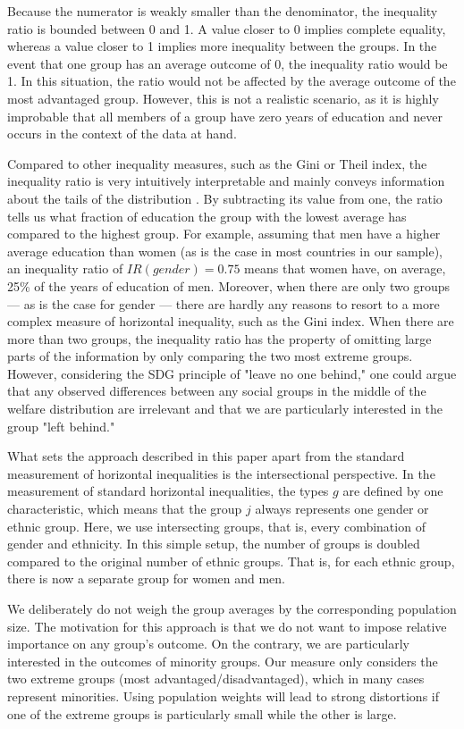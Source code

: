Because the numerator is weakly smaller than the denominator, the inequality ratio is bounded between 0 and 1. A value closer to 0 implies complete equality, whereas a value closer to 1 implies more inequality between the groups. In the event that one group has an average outcome of 0, the inequality ratio would be 1. In this situation, the ratio would not be affected by the average outcome of the most advantaged group. However, this is not a realistic scenario, as it is highly improbable that all members of a group have zero years of education and never occurs in the context of the data at hand.

Compared to other inequality measures, such as the Gini or Theil index, the inequality ratio is very intuitively interpretable and mainly conveys information about the tails of the distribution \citep{Conceicao2000, Cobham2013}. By subtracting its value from one, the ratio tells us what fraction of education the group with the lowest average has compared to the highest group. For example, assuming that men have a higher average education than women (as is the case in most countries in our sample), an inequality ratio of $IR(gender)=0.75$ means that women have, on average, 25\% of the years of education of men. Moreover, when there are only two groups --- as is the case for gender --- there are hardly any reasons to resort to a more complex measure of horizontal inequality, such as the Gini index. When there are more than two groups, the inequality ratio has the property of omitting large parts of the information by only comparing the two most extreme groups. However, considering the SDG principle of "leave no one behind," one could argue that any observed differences between any social groups in the middle of the welfare distribution are irrelevant and that we are particularly interested in the group "left behind." 

What sets the approach described in this paper apart from the standard measurement of horizontal inequalities is the intersectional perspective. In the measurement of standard horizontal inequalities, the types $g$ are defined by one characteristic, which means that the group $j$ always represents one gender or ethnic group. Here, we use intersecting groups, that is, every combination of gender and ethnicity. In this simple setup, the number of groups is doubled compared to the original number of ethnic groups. That is, for each ethnic group, there is now a separate group for women and men.

We deliberately do not weigh the group averages by the corresponding population size. The motivation for this approach is that we do not want to impose relative importance on any group's outcome. On the contrary, we are particularly interested in the outcomes of minority groups. Our measure only considers the two extreme groups (most advantaged/disadvantaged), which in many cases represent minorities. Using population weights will lead to strong distortions if one of the extreme groups is particularly small while the other is large. 

